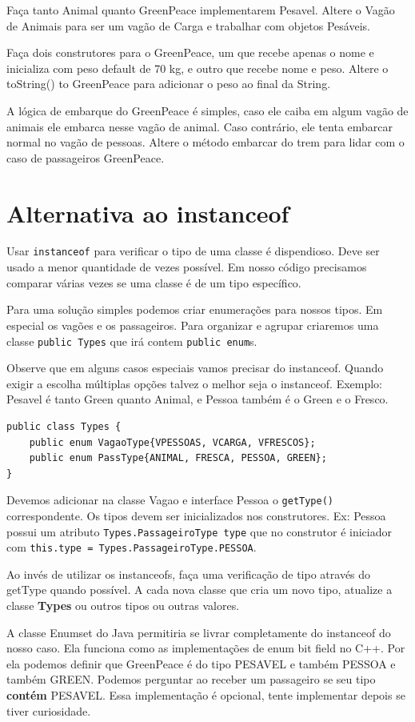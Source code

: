 \documentclass[12pt]{article}
\renewcommand{\tt}[1]{\lstinline|#1|}
\renewcommand{\bf}[1]{\textbf{#1}}
\begin{document}
{Faça tanto Animal quanto GreenPeace implementarem Pesavel.
Altere o Vagão de Animais para ser um vagão de Carga e trabalhar com objetos Pesáveis.

Faça dois construtores para o GreenPeace, um que recebe apenas o nome e inicializa com peso default de 70 kg, e outro
que recebe nome e peso.
Altere o toString() to GreenPeace para adicionar o peso ao final da String.

A lógica de embarque do GreenPeace é simples, caso ele caiba em algum vagão de animais ele embarca nesse vagão de animal. Caso contrário, ele tenta embarcar normal no vagão de pessoas.
Altere o método embarcar do trem para lidar com o caso de passageiros GreenPeace.

\section{Alternativa ao instanceof}
Usar \tt{instanceof} para verificar o tipo de uma classe é dispendioso. Deve ser usado a menor quantidade de vezes possível.
Em nosso código precisamos comparar várias vezes se uma classe é de um tipo específico. 

Para uma solução simples podemos criar enumerações para nossos tipos. Em especial os vagões e os passageiros.
Para organizar e agrupar criaremos uma classe \tt{public Types} que irá contem \tt{public enum}s.

Observe que em alguns casos especiais vamos precisar do instanceof. Quando exigir a escolha múltiplas opções talvez o melhor seja
o instanceof. Exemplo: Pesavel é tanto Green quanto Animal, e Pessoa também é o Green e o Fresco.

\begin{lstlisting}[float=ht]
public class Types {
	public enum VagaoType{VPESSOAS, VCARGA, VFRESCOS};
	public enum PassType{ANIMAL, FRESCA, PESSOA, GREEN};
}
\end{lstlisting}

Devemos adicionar na classe Vagao e interface Pessoa o \tt{getType()} correspondente. Os tipos devem ser inicializados nos construtores. Ex: Pessoa possui um atributo \tt{Types.PassageiroType type} que no construtor é iniciador com
\tt{this.type = Types.PassageiroType.PESSOA}. 

Ao invés de utilizar os instanceofs, faça uma verificação de tipo através do getType quando possível. A cada nova classe que cria um novo tipo, atualize a classe \bf{Types} ou outros tipos ou outras valores.

A classe Enumset do Java permitiria se livrar completamente do instanceof do nosso caso. Ela funciona como as implementações de enum bit field no C++. Por ela podemos definir que GreenPeace é do tipo PESAVEL e também PESSOA e também GREEN. Podemos perguntar ao receber um passageiro se seu tipo \bf{contém} PESAVEL. Essa implementação é opcional, tente implementar depois se tiver curiosidade.

}
\end{document}
